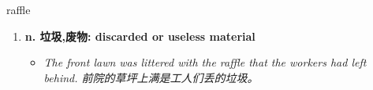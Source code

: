 
\begin{frame}
{\huge raffle}
\begin{center}
\begin{enumerate}\Large
  \item \textbf{n. 垃圾,废物: discarded or useless material}
  \begin{itemize}
    \item \em{\Large{The front lawn was littered with the raffle that the workers had left behind. 前院的草坪上满是工人们丢的垃圾。}}
  \end{itemize}
\end{enumerate}
\end{center}
\end{frame}
